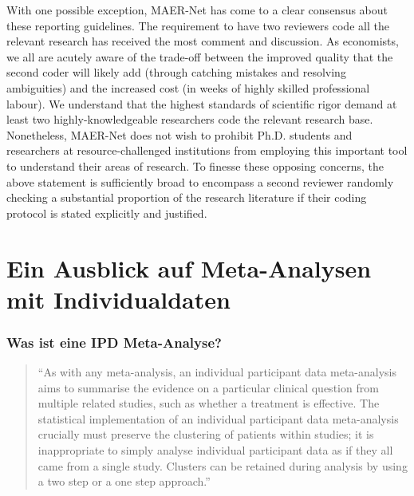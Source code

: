\begin{frame}[allowframebreaks]
With one possible exception, MAER-Net has come to a clear consensus about these
reporting guidelines.  The requirement to have two reviewers code all the
relevant research has received the most comment and discussion.  As economists,
we all are acutely aware of the trade-off between the improved quality that the
second coder will likely add (through catching mistakes and resolving
ambiguities) and the increased cost (in weeks of highly skilled professional
labour). We understand that the highest standards of scientific rigor demand at
least two highly-knowledgeable researchers code the relevant research base.
Nonetheless, MAER-Net does not wish to prohibit Ph.D. students and researchers
at resource-challenged institutions from employing this important tool
to understand their areas of research.  To finesse these opposing concerns, the
above statement is sufficiently broad to encompass a second reviewer randomly
checking a substantial proportion of the research literature if their coding
protocol is stated explicitly and justified.


\end{frame}




\section{Ein Ausblick auf Meta-Analysen mit Individualdaten}

\begin{frame}\frametitle{Was ist eine IPD Meta-Analyse?}

  \begin{quotation}
    \enquote{As with any meta-analysis, an individual participant data meta-analysis aims
    to summarise the evidence on a particular clinical question from multiple
    related studies, such as whether a treatment is effective. The statistical
    implementation of an individual participant data meta-analysis crucially
    \alert{must preserve the clustering of patients within studies}; it is inappropriate
    to simply analyse individual participant data as if they all came from a
    single study. Clusters can be retained during analysis by using a two step
    or a one step approach.}
  \end{quotation}

  \citep[Quelle: ][1]{riley_meta-analysis_2010}

\end{frame}


